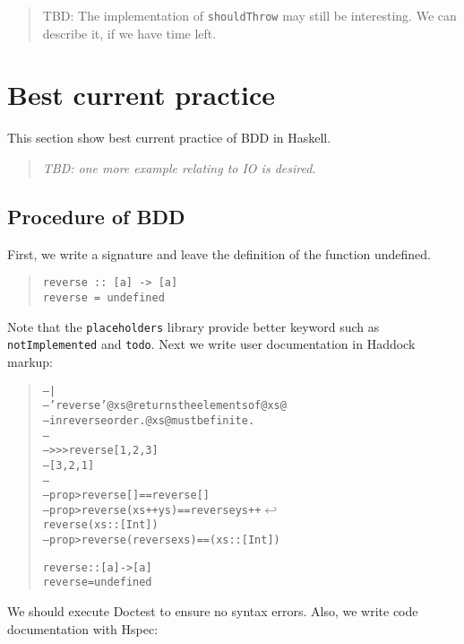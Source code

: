 \documentclass[preprint]{sigplanconf}
\begin{document}
\begin{quote}
    TBD: The implementation of \verb|shouldThrow| may still be
    interesting.  We can describe it, if we have time left.
\end{quote}


\section{Best current practice}
\label{ref:Best-current-practice}

This section show best current practice of
BDD in Haskell.

\begin{quote}
    \emph{TBD: one more example relating to IO is desired.}
\end{quote}

\subsection{Procedure of BDD}

First, we write a signature and leave the definition of the function undefined.

\begin{quote}
\small
\begin{verbatim}
reverse :: [a] -> [a]
reverse = undefined
\end{verbatim}
\end{quote}

\noindent Note that the {\tt placeholders} library provide better keyword such as {\tt notImplemented} and {\tt todo}.
Next we write user documentation in Haddock markup:

\begin{quote}
\small
\begin{alltt}
-- |
-- 'reverse' @xs@ returns the elements of @xs@
-- in reverse order. @xs@ must be finite.
--
-- >>> reverse [1,2,3]
-- [3,2,1]
--
-- prop> reverse [] == reverse []
-- prop> reverse (xs ++ ys) == reverse ys ++ \(\hookleftarrow\)
                               reverse (xs::[Int])
-- prop> reverse (reverse xs) == (xs::[Int])

reverse :: [a] -> [a]
reverse = undefined
\end{alltt}
\end{quote}

\noindent We should execute Doctest to ensure no syntax errors.
Also, we write code documentation with Hspec:
\end{document}
